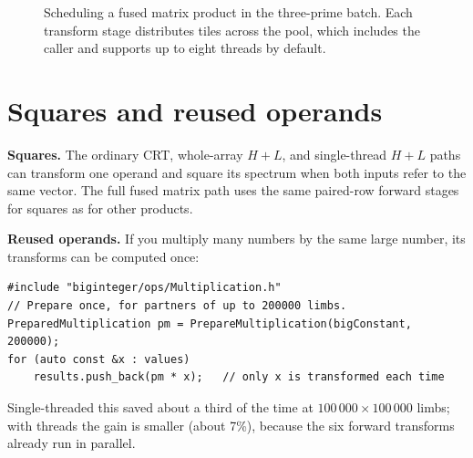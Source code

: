 \begin{figure}[ht]
\centering
{}
\caption{Scheduling a fused matrix product in the three-prime batch. Each transform stage distributes tiles
across the pool, which includes the caller and supports up to eight threads by default.}
\end{figure}

\clearpage
\section{Squares and reused operands}
\label{sec:nttreuse}

\textbf{Squares.} The ordinary CRT, whole-array $H+L$, and single-thread $H+L$ paths
can transform one operand and square its spectrum when both inputs refer to the
same vector. The full fused matrix path uses the same paired-row forward stages
for squares as for other products.

\textbf{Reused operands.} If you multiply many numbers by the same large number, its
transforms can be computed once:

\begin{lstlisting}
#include "biginteger/ops/Multiplication.h"
// Prepare once, for partners of up to 200000 limbs.
PreparedMultiplication pm = PrepareMultiplication(bigConstant, 200000);
for (auto const &x : values)
    results.push_back(pm * x);   // only x is transformed each time
\end{lstlisting}

Single-threaded this saved about a third of the time at $100\,000 \times 100\,000$ limbs; with
threads the gain is smaller (about 7\%), because the six forward transforms already run in
parallel.

